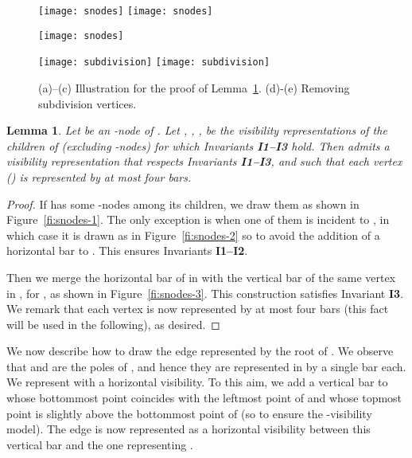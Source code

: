 \documentclass{article}
\newtheorem{lemma}{Lemma}
\begin{document}
\begin{figure}[t]
    \centering
    \begin{minipage}[b]{.32\textwidth}
    	\centering
    	\texttt{[image: snodes]}
    	\subcaption{}\label{fi:snodes-1}
    	\vspace{1cm}
    	\texttt{[image: snodes]}
    	\subcaption{}\label{fi:snodes-2}
    \end{minipage}
    \hfill
    \begin{minipage}[b]{.32\textwidth}
    	\centering
    	\texttt{[image: snodes]}
    	\subcaption{}\label{fi:snodes-3}
    \end{minipage}
    \begin{minipage}[b]{.32\textwidth}
    	\centering
    	\texttt{[image: subdivision]}
    	\subcaption{}\label{fi:subdivision-1}
    	\vspace{1cm}
    	\texttt{[image: subdivision]}
    	\subcaption{}\label{fi:subdivision-2}
    \end{minipage}
    \caption{ (a)--(c) Illustration for the proof of Lemma~\ref{le:snodes}. (d)-(e) Removing subdivision vertices.}
\end{figure}

\begin{lemma}\label{le:snodes}
Let  be an -node of . Let , , ,  be the  visibility representations of the  children of  (excluding -nodes) for which Invariants {\bf I1--I3} hold. Then  admits a visibility representation  that respects Invariants {\bf I1--I3}, and such that each vertex  () is  represented by at most four bars.
\end{lemma}
\begin{proof}
If  has some -nodes among its children, we draw them as shown in Figure~\ref{fi:snodes-1}. The only exception is when one of them is incident to , in which case it is drawn as in Figure~\ref{fi:snodes-2} so to avoid the addition of a horizontal bar to . This ensures Invariants {\bf I1--I2}.

Then we merge the horizontal bar of  in  with the vertical bar of the same vertex in , for , as shown in Figure~\ref{fi:snodes-3}. This construction satisfies Invariant {\bf I3}. We remark that each vertex  is now represented by at most four bars  (this fact will be used in the following), as desired.
\end{proof}


We now describe how to draw the edge  represented by the root  of . We observe that  and  are the poles of , and hence they are represented in  by a single bar each. We represent  with a horizontal visibility. To this aim, we add a vertical bar to  whose bottommost point coincides with the leftmost point of  and whose topmost point is slightly above the bottommost point of  (so to ensure the -visibility model). The edge  is now represented as a horizontal visibility between this vertical bar and the one representing .
\end{document}
